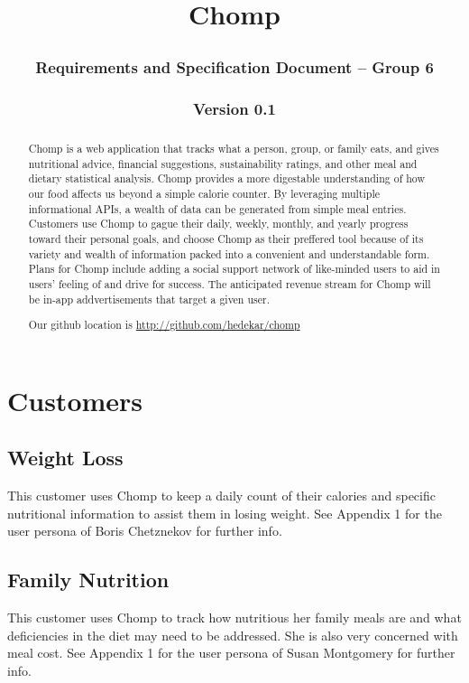 \documentclass[a4paper,12pt]{article}
\begin{document}
\title{Chomp
\subsubsection*{Requirements and Specification Document -- Group 6}\subsubsection*{Version 0.1}
}\maketitle

\renewcommand{\abstractname}{Project Abstract}
\begin{abstract}

Chomp is a web application that tracks what a person, group, or family eats, and gives nutritional advice, financial suggestions, sustainability ratings, and other meal and dietary statistical analysis.  Chomp provides a more digestable understanding of how our food affects us beyond a simple calorie counter.  By leveraging multiple informational APIs, a wealth of data can be generated from simple meal entries.  Customers use Chomp to gague their daily, weekly, monthly, and yearly progress toward their personal goals, and choose Chomp as their preffered tool because of its variety and wealth of information packed into a convenient and understandable form.  Plans for Chomp include adding a social support network of like-minded users to aid in users' feeling of and drive for success.  The anticipated revenue stream for Chomp will be in-app addvertisements that target a given user.

Our github location is \url{http://github.com/hedekar/chomp}
\end{abstract}
\newpage

\tableofcontents
\newpage
\section{Customers}
\subsection{Weight Loss}
This customer uses Chomp to keep a daily count of their calories and specific nutritional information to assist them in losing weight.  See Appendix 1 for the user persona of Boris Chetznekov for further info.
\subsection{Family Nutrition}
This customer uses Chomp to track how nutritious her family meals are and what deficiencies in the diet may need to be addressed.  She is also very concerned with meal cost.  See Appendix 1 for the user persona of Susan Montgomery for further info.
\end{document}
